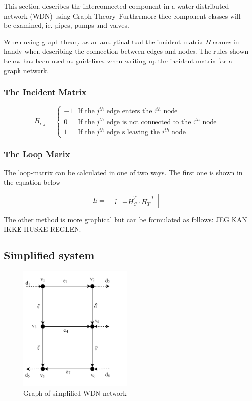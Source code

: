 This section describes the interconnected component in a water distributed network (WDN) using Graph Theory. Furthermore thee component classes will be examined, ie. pipes, pumps and valves.

When using graph theory as an analytical tool the incident matrix $H$ comes in handy when describing the connection between edges and nodes. The rules shown below has been used as guidelines when writing up the incident matrix for a graph network. 

\subsubsection{The Incident Matrix}
\begin{equation*}
	H_{i,j} = \begin{cases}
		-1 & \text{If the $j^{th}$ edge enters the $i^{th}$ node} \\
		0 & \text{If the $j^{th}$ edge is not connected to the $i^{th}$ node} \\
		1 & \text{If the $j^{th}$ edge s leaving the $i^{th}$ node}
	\end{cases}
\end{equation*} %

\subsubsection{The Loop Marix}
The loop-matrix can be calculated in one of two ways. The first one is shown in the equation below

\begin{equation} \label{Bmatrix}
	B = \begin{bmatrix}
		I & -\bar{H}_{C}^{T}\cdot\bar{H}_{T}^{-T}
	\end{bmatrix}
\end{equation}


The other method is more graphical but can be formulated as follows: JEG KAN IKKE HUSKE REGLEN.

\newpage
\subsection{Simplified system}
\begin{figure}[h!]
	\centering
	\includegraphics[width=0.5\textwidth]{Pictures/Graph.png}
	\caption{Graph of simplified WDN network \cite{Rathore930}}
	\label{fig:graph}
\end{figure}

